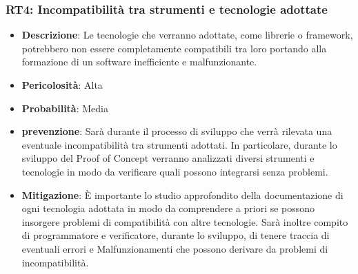 \documentclass[a4paper, 12pt]{article}
\newcommand{\glossario}[1]{\fontfamily{lmr}\selectfont{\textit{#1\textsubscript{\small G}}}}
\begin{document}
\subsubsection{RT4: Incompatibilità tra strumenti e tecnologie adottate}
\begin{itemize}
    \item \textbf{Descrizione}: Le tecnologie che verranno adottate, come librerie o framework, potrebbero non essere completamente compatibili
    tra loro portando alla formazione di un software inefficiente e malfunzionante.
    \item \textbf{Pericolosità}: Alta
    \item \textbf{Probabilità}: Media
    \item \textbf{prevenzione}: Sarà durante il processo di sviluppo che verrà rilevata una eventuale incompatibilità tra strumenti adottati.
    In particolare, durante lo sviluppo del Proof of Concept verranno analizzati diversi strumenti e tecnologie in modo da verificare quali 
    possono integrarsi senza problemi.
    \item \textbf{Mitigazione}: È importante lo studio approfondito della documentazione di ogni tecnologia adottata in modo da comprendere 
    a priori se possono insorgere problemi di compatibilità con altre tecnologie.
    Sarà inoltre compito di programmatore e verificatore, durante lo sviluppo, di tenere traccia di eventuali errori e Malfunzionamenti
    che possono derivare da problemi di incompatibilità.
\end{itemize}
\glossario{Termine glossario}
\end{document}
